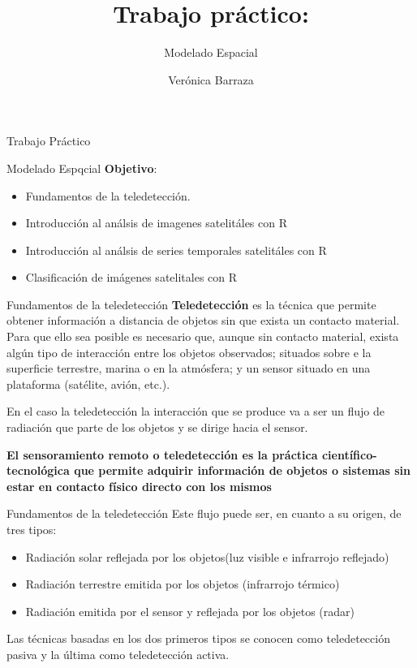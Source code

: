 \documentclass[
  ignorenonframetext,
]{beamer}
\title{Trabajo práctico:}
\subtitle{Modelado Espacial}
\author{Verónica Barraza}
\date{}
\begin{document}
\frame{\titlepage}

\begin{frame}{Trabajo Práctico}
\protect\hypertarget{trabajo-pruxe1ctico}{}
\begin{block}{Modelado Espqcial}
\protect\hypertarget{modelado-espqcial}{}
\textbf{Objetivo}:

\begin{itemize}
\item
  Fundamentos de la teledetección.
\item
  Introducción al análsis de imagenes satelitáles con R
\item
  Introducción al análsis de series temporales satelitáles con R
\item
  Clasificación de imágenes satelitales con R
\end{itemize}
\end{block}
\end{frame}

\begin{frame}{Fundamentos de la teledetección}
\protect\hypertarget{fundamentos-de-la-teledetecciuxf3n}{}
\textbf{Teledetección} es la técnica que permite obtener información a
distancia de objetos sin que exista un contacto material. Para que ello
sea posible es necesario que, aunque sin contacto material, exista algún
tipo de interacción entre los objetos observados; situados sobre e la
superficie terrestre, marina o en la atmósfera; y un sensor situado en
una plataforma (satélite, avión, etc.).

En el caso la teledetección la interacción que se produce va a ser un
flujo de radiación que parte de los objetos y se dirige hacia el sensor.

\textbf{El sensoramiento remoto o teledetección es la práctica
científico-tecnológica que permite adquirir información de objetos o
sistemas sin estar en contacto físico directo con los mismos}
\end{frame}

\begin{frame}{Fundamentos de la teledetección}
\protect\hypertarget{fundamentos-de-la-teledetecciuxf3n-1}{}
Este flujo puede ser, en cuanto a su origen, de tres tipos:

\begin{itemize}
\item
  Radiación solar reflejada por los objetos(luz visible e infrarrojo
  reflejado)
\item
  Radiación terrestre emitida por los objetos (infrarrojo térmico)
\item
  Radiación emitida por el sensor y reflejada por los objetos (radar)
\end{itemize}

Las técnicas basadas en los dos primeros tipos se conocen como
teledetección pasiva y la última como teledetección activa.
\end{frame}
\end{document}
